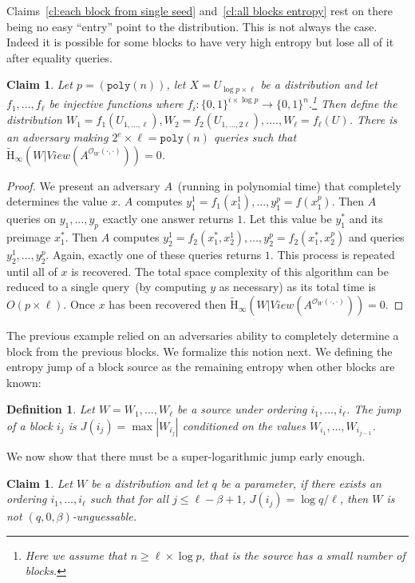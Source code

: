 \documentclass[11pt]{article}
\newcommand{\zo}{\ensuremath{\{0, 1\}}}
\newcommand{\poly}{\ensuremath{\mathtt{poly}}\xspace}
\newcommand{\Hav}{\tilde{\mathrm{H}}_\infty}
\newtheorem{definition}[theorem]{Definition}
\newtheorem{claim}[theorem]{Claim}
\begin{document}
Claims~\ref{cl:each block from single seed} and~\ref{cl:all blocks entropy} rest on there being no easy ``entry'' point to the distribution.  This is not always the case.  Indeed it is possible for some blocks to have very high entropy but lose all of it after equality queries.

\begin{claim}
Let $p = (\poly(n))$, let $X = U_{\log p\times \ell}$ be a distribution and let $f_1,..., f_{\ell}$ be injective functions where $f_i:\zo^{i\times \log p}\rightarrow \zo^n$.\footnote{Here we assume that $n\ge \ell \times \log p$, that is the source has a small number of blocks.}  Then define the distribution $W_1 = f_1(U_{1,...,\ell}), W_2 = f_2(U_{1,..., 2\ell}),...., W_\ell = f_\ell(U)$.  There is an adversary making $2^e\times \ell = \poly(n)$ queries such that $\Hav(W | View(A^{\mathcal{O}_W(\cdot, \cdot)})) = 0$.
\end{claim}
\begin{proof}
We present an adversary $A$~(running in polynomial time) that completely determines the value $x$.  $A$ computes $y_1^1 = f_1(x_1^1),..., y_1^p = f(x_1^p)$.  Then $A$ queries on $y_1,..., y_p$ exactly one answer returns $1$.  Let this value be $y_1^*$ and its preimage $x_1^*$.  Then $A$ computes $y_2^1 = f_2(x_1^*,x_2^1), ..., y_2^p= f_2(x_1^*, x_2^p)$ and queries $y_2^1,..., y_2^p$.  Again, exactly one of these queries returns $1$.  This process is repeated until all of $x$ is recovered.  The total space complexity of this algorithm can be reduced to a single query~(by computing $y$ as necessary) as its total time is $O(p\times \ell)$.  Once $x$ has been recovered then $\Hav(W | View(A^{\mathcal{O}_W(\cdot, \cdot)})) = 0$.
\end{proof}

The previous example relied on an adversaries ability to completely determine a block from the previous blocks.  We formalize this notion next.  We defining the entropy jump of a block source as the remaining entropy when other blocks are known:

\begin{definition}
Let $W = W_1,..., W_\ell$ be a source under ordering $i_1,..., i_\ell$.  The \emph{jump} of a block $i_j$ is $J(i_j) = \max|W_{i_j} |$ conditioned on the values $W_{i_1},..., W_{i_{j-1}}$.
\end{definition}

\noindent
We now show that there must be a super-logarithmic jump early enough.

\begin{claim}
Let $W$ be a distribution and let $q$ be a parameter, if there exists an ordering $i_1,..., i_\ell$ such that for all $j\le \ell-\beta +1$, $J(i_j) = \log q /\ell$, then $W$ is not $(q, 0, \beta)$-unguessable.
\end{claim}
\end{document}
